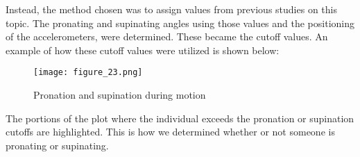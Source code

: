 Instead, the method chosen was to assign values from previous studies on this topic.
The pronating and supinating angles using those values and the positioning of the accelerometers, were determined.
These became the cutoff values.
An example of how these cutoff values were utilized is shown below:\par

\begin{figure}[h]
  \centering
  \texttt{[image: figure\_23.png]}
  \caption[Pronation and supination data]{Pronation and supination during motion}
  \label{fig:x pron. motion}
\end{figure}

The portions of the plot where the individual exceeds the pronation or supination cutoffs are highlighted.
This is how we determined whether or not someone is pronating or supinating.
